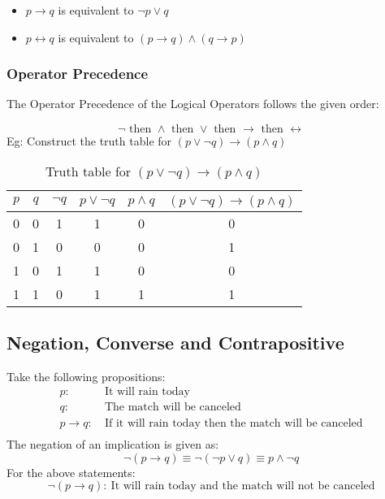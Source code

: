 \documentclass[14pt]{extarticle}
\newcommand{\impl}{\xrightarrow{}}
\newcommand{\ifff}{\longleftrightarrow}
\begin{document}
\begin{itemize}
    \item $p \impl q$ is equivalent to $\neg p \lor q$
    \item $p \ifff q$ is equivalent to $(p \impl q) \land (q \impl p)$
\end{itemize}

\subsubsection{Operator Precedence}

The Operator Precedence of the Logical Operators follows the given order:

\[\neg \text{ then } \land \text{ then } \lor \text{ then } \impl \text{ then } \ifff\]
\newpage
Eg: Construct the truth table for $(p \lor \neg q) \impl (p \land q)$

\begin{table}[ht]
    \centering
    \begin{tabular}{|c|c|c|c|c|c|}
        \hline
        $p$ & $q$ & $\neg q$ & $p \lor \neg q$ & $p \land q$ & $(p \lor \neg q) \impl (p \land q)$ \\
        \hline
        0 & 0 & 1 & 1 & 0 & 0 \\
        0 & 1 & 0 & 0 & 0 & 1 \\
        1 & 0 & 1 & 1 & 0 & 0 \\
        1 & 1 & 0 & 1 & 1 & 1 \\
        \hline
    \end{tabular}
    \caption{Truth table for $(p \lor \neg q) \impl (p \land q)$}
    \label{tab:fourth}
\end{table}

\subsection{Negation, Converse and Contrapositive}
Take the following propositions:
\begin{align*}
        p:& \ \text{It will rain today} \\
        q:& \ \text{The match will be canceled} \\
        p \impl q :& \ \text{If it will rain today then the match will be canceled} \\
\end{align*}
The negation of an implication is given as:
\[
    \neg (p \impl q) \equiv \neg (\neg p \lor q) \equiv p \land \neg q
\]
For the above statements:
\[
    \neg (p \impl q) : \ \text{It will rain today and the match will not be canceled}
\]
\end{document}
